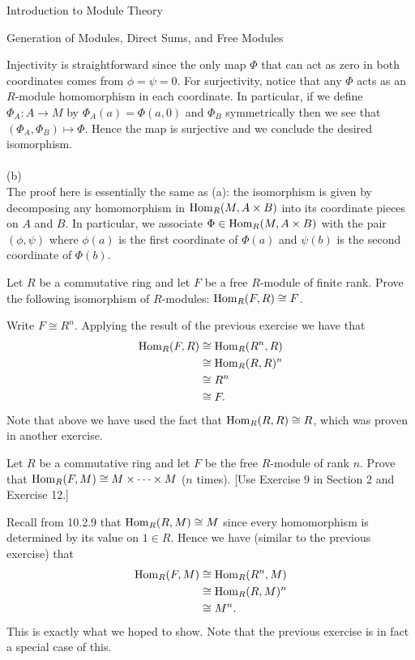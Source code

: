 \begin{chapter}{Introduction to Module Theory}
\begin{section}{Generation of Modules, Direct Sums, and Free Modules}
\begin{solution}
Injectivity is straightforward since the only map $\Phi$ that can act as zero in both coordinates comes from $\phi=\psi = 0$. For surjectivity, notice that any $\Phi$ acts as an $R$-module homomorphism in each coordinate. In particular, if we define $\Phi_A:A\to M$ by $\Phi_A(a) = \Phi(a,0)$ and $\Phi_B$ symmetrically then we see that $(\Phi_A,\Phi_B)\mapsto \Phi$. Hence the map is surjective and we conclude the desired isomorphism.\\\\
(b)\\
The proof here is essentially the same as (a): the isomorphism is given by decomposing any homomorphism in $\operatorname{Hom}_R(M,A\times B)$ into its coordinate pieces on $A$ and $B$. In particular, we associate $\Phi\in \operatorname{Hom}_R(M,A\times B)$ with the pair $(\phi,\psi)$ where $\phi(a) $ is the first coordinate of $\Phi(a)$ and $\psi(b)$ is the second coordinate of $\Phi(b)$. 
\end{solution}\oneperpage



\begin{problem}\label{ex:10.3.13}
Let $R$ be a commutative ring and let $F$ be a free $R$-module of finite rank. Prove the following isomorphism of $R$-modules: $\operatorname{Hom}_R(F,R)\cong F$. 
\end{problem}
\begin{solution}Write $F\cong R^n$. Applying the result of the previous exercise we have that \begin{align*}
\operatorname{Hom}_R(F,R) &\cong \operatorname{Hom}_R(R^n,R)\\
&\cong \operatorname{Hom}_R(R,R)^n\\
& \cong R^n\\
&\cong F.
\end{align*}
Note that above we have used the fact that $\operatorname{Hom}_R(R,R) \cong R$, which was proven in another exercise.

\end{solution}\oneperpage



\begin{problem}\label{ex:10.3.14}
Let $R$ be a commutative ring and let $F$ be the free $R$-module of rank $n$. Prove that $\operatorname{Hom}_R(F,M)\cong M\times \cdots\times M$ ($n$ times). [Use Exercise 9 in Section 2 and Exercise 12.]
\end{problem}
\begin{solution}Recall from 10.2.9 that $\operatorname{Hom}_R(R,M) \cong M$ since every homomorphism is determined by its value on $1\in R$. Hence we have (similar to the previous exercise) that \begin{align*}
\operatorname{Hom}_R(F,M) &\cong \operatorname{Hom}_R(R^n,M)\\
&\cong \operatorname{Hom}_R(R,M)^n\\
& \cong M^n.
\end{align*}
This is exactly what we hoped to show. Note that the previous exercise is in fact a special case of this. 


\end{solution}
\end{section}
\end{chapter}
